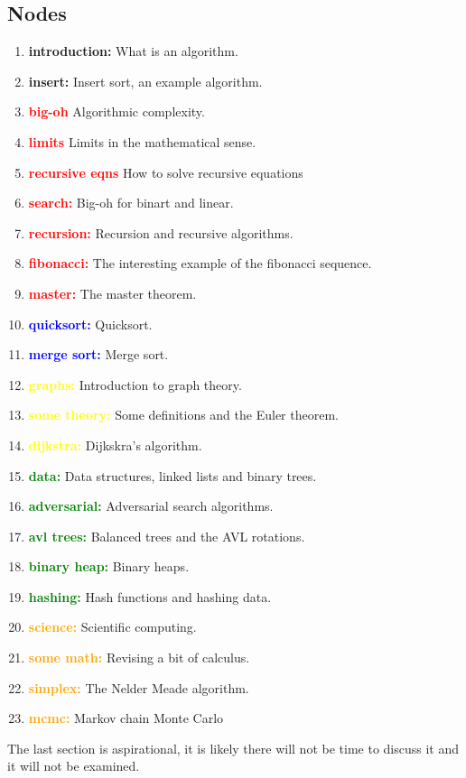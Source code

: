 \documentclass[11pt,a4paper]{scrartcl}
\begin{document}
\subsection*{Nodes}

\begin{enumerate}[label=(\alph*)]
\item \textbf{introduction:} What is an algorithm.
\item \textbf{insert:} Insert sort, an example algorithm.
\item \textbf{\textcolor{red}{big-oh}} Algorithmic complexity.
\item \textbf{\textcolor{red}{limits}} Limits in the mathematical sense.
\item \textbf{\textcolor{red}{recursive eqns}} How to solve recursive equations
\item \textbf{\textcolor{red}{search:}} Big-oh for binart and linear.
\item \textbf{\textcolor{red}{recursion:}} Recursion and recursive algorithms.
\item \textbf{\textcolor{red}{fibonacci:}} The interesting example of the fibonacci sequence. 
\item \textbf{\textcolor{red}{master:}} The master theorem.
\item \textbf{\textcolor{blue}{quicksort:}} Quicksort.
\item \textbf{\textcolor{blue}{merge sort:}} Merge sort.
\item \textbf{\textcolor{yellow}{graphs:}} Introduction to graph theory.
\item \textbf{\textcolor{yellow}{some theory:}} Some definitions and the Euler theorem. 
\item \textbf{\textcolor{yellow}{dijkstra:}} Dijkskra's algorithm.
\item \textbf{\textcolor{green}{data:}} Data structures, linked lists and binary trees.
\item \textbf{\textcolor{green}{adversarial:}} Adversarial search algorithms.
\item \textbf{\textcolor{green}{avl trees:}} Balanced trees and the AVL rotations. 
\item \textbf{\textcolor{green}{binary heap:}} Binary heaps. 
\item \textbf{\textcolor{green}{hashing:}} Hash functions and hashing data. 
\item \textbf{\textcolor{orange}{science:}} Scientific computing.
\item \textbf{\textcolor{orange}{some math:}} Revising a bit of calculus.
\item \textbf{\textcolor{orange}{simplex:}} The Nelder Meade algorithm.
\item \textbf{\textcolor{orange}{mcmc:}} Markov chain Monte Carlo

\end{enumerate}

The last section is aspirational, it is likely there will not be time to discuss it and it will not be examined.
\end{document}
